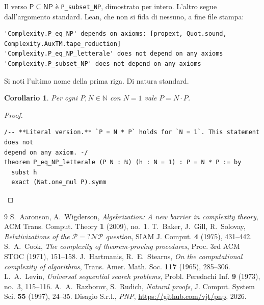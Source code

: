 \documentclass[11pt,a4paper]{amsart}
\newtheorem{corollario}[teorema]{Corollario}
\begin{document}
Il verso $\mathsf{P} \subseteq \mathsf{NP}$ è \texttt{P\_subset\_NP}, dimostrato
per intero. L'altro segue dall'argomento standard. Lean, che non si fida di
nessuno, a fine file stampa:

\begin{listato}[\scriptsize]
\begin{verbatim}
'Complexity.P_eq_NP' depends on axioms: [propext, Quot.sound, Complexity.AuxTM.tape_reduction]
'Complexity.P_eq_NP_letterale' does not depend on any axioms
'Complexity.P_subset_NP' does not depend on any axioms
\end{verbatim}
\end{listato}

\noindent Si noti l'ultimo nome della prima riga. Di natura standard.

\begin{corollario}\label{cor:lett}
Per ogni $P, N \in \mathbb{N}$ con $N = 1$ vale $P = N \cdot P$.
\end{corollario}

\begin{proof}
\begin{listato}
\begin{verbatim}
/-- **Literal version.** `P = N * P` holds for `N = 1`. This statement does not
depend on any axiom. -/
theorem P_eq_NP_letterale (P N : ℕ) (h : N = 1) : P = N * P := by
  subst h
  exact (Nat.one_mul P).symm
\end{verbatim}
\end{listato}
\end{proof}

\begin{thebibliography}{9}
 S.~Aaronson, A.~Wigderson,
  \emph{Algebrization: A new barrier in complexity theory},
  ACM Trans. Comput. Theory \textbf{1} (2009), no.~1.
 T.~Baker, J.~Gill, R.~Solovay,
  \emph{Relativizations of the $\mathcal{P} =? \mathcal{NP}$ question},
  SIAM J. Comput. \textbf{4} (1975), 431--442.
 S.~A.~Cook,
  \emph{The complexity of theorem-proving procedures},
  Proc. 3rd ACM STOC (1971), 151--158.
 J.~Hartmanis, R.~E.~Stearns,
  \emph{On the computational complexity of algorithms},
  Trans. Amer. Math. Soc. \textbf{117} (1965), 285--306.
 L.~A.~Levin,
  \emph{Universal sequential search problems},
  Probl. Peredachi Inf. \textbf{9} (1973), no.~3, 115--116.
 A.~A.~Razborov, S.~Rudich,
  \emph{Natural proofs},
  J. Comput. System Sci. \textbf{55} (1997), 24--35.
 Disagio S.r.l.,
  \emph{PNP}, \url{https://github.com/vjt/pnp}, 2026.
\end{thebibliography}
\end{document}
